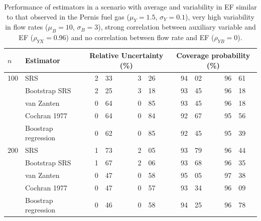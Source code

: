 \begin{table}
	\caption{Performance of estimators in a scenario with average and variability in EF similar to that observed in the Pernis fuel gas ($\mu_Y=1.5$, $\sigma_Y=0.1$), very high variability in flow rates ($\mu_B=10$, $\sigma_B=3$), strong correlation between auxiliary variable and EF ($\rho_{YX}=0.96$) and no correlation between flow rate and EF ($\rho_{YB}=0$).}
	\begin{tabular}{l l r@{.}l@{ - }r@{.}l r@{.}l@{ - }r@{.}l}
		\hline
		$n$ & Estimator & \multicolumn{4}{c}{Relative Uncertainty (\%)} & \multicolumn{4}{c}{Coverage probability (\%)} \\
		\hline
		100 & SRS 		 		& 2&33&3&26 & 94&02&96&61 \\
		    & Bootstrap SRS 	& 2&25&3&18 & 93&45&96&18 \\
		    & van Zanten   		& 0&64&0&85 & 93&45&96&18 \\
		    & Cochran 1977 		& 0&64&0&84 & 92&67&95&56 \\
		    & Boostrap regression & 0&62&0&85 & 92&45&95&39 \\
		\cline{2-10}
		200 & SRS 		 		& 1&73&2&05 & 93&79&96&44 \\
		    & Bootstrap SRS 	& 1&67&2&06 & 93&68&96&35 \\
		    & van Zanten   		& 0&47&0&58 & 95&05&97&38 \\
		    & Cochran 1977 		& 0&47&0&57 & 93&34&96&09 \\
		    & Boostrap regression & 0&46&0&58 & 94&25&96&78 \\
		\hline
	\end{tabular}\label{tab:batch2}
\end{table}

